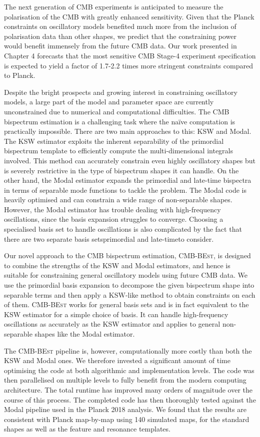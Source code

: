 The next generation of CMB experiments is anticipated to measure the polarisation of the CMB with greatly enhanced sensitivity. Given that the Planck constraints on oscillatory models benefited much more from the inclusion of polarisation data than other shapes, we predict that the constraining power would benefit immensely from the future CMB data. Our work presented in Chapter 4 forecasts that the most sensitive CMB Stage-4 experiment specification is expected to yield a factor of 1.7-2.2 times more stringent constraints compared to Planck.

Despite the bright prospects and growing interest in constraining oscillatory models, a large part of the model and parameter space are currently unconstrained due to numerical and computational difficulties. The CMB bispectrum estimation is a challenging task where the na\"ive computation is practically impossible. There are two main approaches to this: KSW and Modal. The KSW estimator exploits the inherent separability of the primordial bispectrum template to efficiently compute the multi-dimensional integrals involved. This method can accurately constrain even highly oscillatory shapes but is severely restrictive in the type of bispectrum shapes it can handle. On the other hand, the Modal estimator expands the primordial and late-time bispectra in terms of separable mode functions to tackle the problem. The Modal code is heavily optimised and can constrain a wide range of non-separable shapes. However, the Modal estimator has trouble dealing with high-frequency oscillations, since the basis expansion struggles to converge. Choosing a specialised basis set to handle oscillations is also complicated by the fact that there are two separate basis sets\textemdash primordial and late-time\textemdash to consider.

Our novel approach to the CMB bispectrum estimation, \textsc{CMB-BEst}, is designed to combine the strengths of the KSW and Modal estimators, and hence is suitable for constraining general oscillatory models using future CMB data. We use the primordial basis expansion to decompose the given bispectrum shape into separable terms and then apply a KSW-like method to obtain constraints on each of them. \textsc{CMB-BEst} works for general basis sets and is in fact equivalent to the KSW estimator for a simple choice of basis. It can handle high-frequency oscillations as accurately as the KSW estimator and applies to general non-separable shapes like the Modal estimator.

The \textsc{CMB-BEst} pipeline is, however, computationally more costly than both the KSW and Modal ones. We therefore invested a significant amount of time optimising the code at both algorithmic and implementation levels. The code was then parallelised on multiple levels to fully benefit from the modern computing architecture. The total runtime has improved many orders of magnitude over the course of this process. The completed code has then thoroughly tested against the Modal pipeline used in the Planck 2018 analysis. We found that the results are consistent with Planck map-by-map using 140 simulated maps, for the standard shapes as well as the feature and resonance templates.

